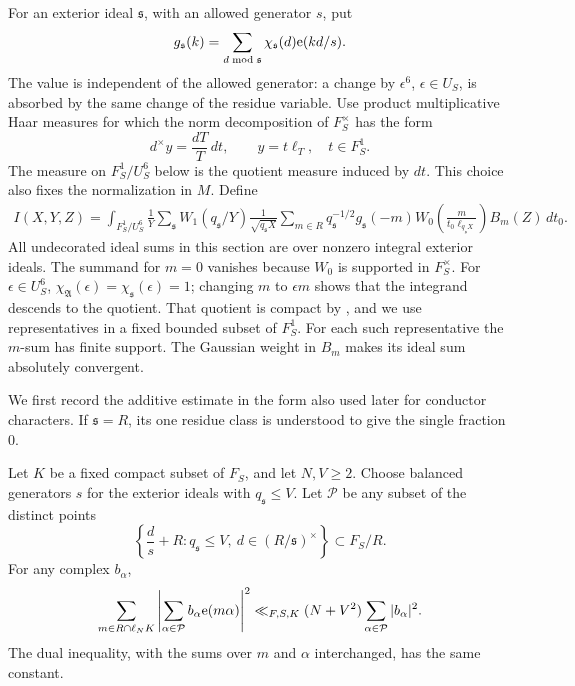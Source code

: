 For an exterior ideal \(\mathfrak s\), with an allowed generator \(s\), put
\[
 g_{\mathfrak s}(k)
   =\sum_{d\bmod\mathfrak s}\chi_{\mathfrak s}(d)\mathrm{e}(kd/s).
\]
The value is independent of the allowed generator: a change by
\(\epsilon^6\), \(\epsilon\in U_S\), is absorbed by the same change of
the residue variable.  Use product multiplicative Haar measures for which
the norm decomposition of \(F_S^\times\) has the form
\[
 d^\times y=\frac{dT}{T}\,dt,\qquad y=t\ell_T,\quad t\in F_S^1.
\]
The measure on \(F_S^1/U_S^6\) below is the quotient measure induced by
\(dt\).  This choice also fixes the normalization in \(M\).
Define
\begin{equation}
 \begin{split}
 I(X,Y,Z)=\int_{F_S^1/U_S^6}
 \frac1Y\sum_{\mathfrak s}W_1(q_{\mathfrak s}/Y)
 \frac1{\sqrt{q_{\mathfrak s}X}}\sum_{m\in R}
  q_{\mathfrak s}^{-1/2}g_{\mathfrak s}(-m)
  W_0\!\left(\frac{m}{t_0\ell_{q_{\mathfrak s}X}}\right)
  B_m(Z)\,dt_0 .
 \end{split}
\label{eq:poisson-probe}
\end{equation}
All undecorated ideal sums in this section are over nonzero integral
exterior ideals.  The summand for \(m=0\) vanishes because \(W_0\) is
supported in \(F_S^\times\).  For \(\epsilon\in U_S^6\),
\(\chi_{\mathfrak A}(\epsilon)=\chi_{\mathfrak s}(\epsilon)=1\);
changing \(m\) to \(\epsilon m\) shows that the integrand descends to the
quotient.  That quotient is compact by
, and we use representatives in a fixed
bounded subset of \(F_S^1\).  For each such representative the \(m\)-sum
has finite support.  The Gaussian weight in \(B_m\) makes its ideal sum
absolutely convergent.

We first record the additive estimate in the form also used later for
conductor characters.  If \(\mathfrak s=R\), its one residue class is
understood to give the single fraction \(0\).

\begin{lemma}\label{lem:additive-sieve}
Let \(K\) be a fixed compact subset of \(F_S\), and let \(N,V\ge2\).
Choose balanced generators \(s\) for the exterior ideals with
\(q_{\mathfrak s}\le V\).  Let \(\mathcal P\) be any subset of the distinct
points
\[
 \left\{\frac d s+R:
       q_{\mathfrak s}\le V,\ d\in(R/\mathfrak s)^\times\right\}
       \subset F_S/R.
\]
For any complex \(b_\alpha\),
\begin{equation}
 \sum_{m\in R\cap\ell_NK}
       \left|\sum_{\alpha\in\mathcal P}b_\alpha\mathrm{e}(m\alpha)\right|^2
 \ll_{F,S,K}(N+V^2)\sum_{\alpha\in\mathcal P}|b_\alpha|^2 .
\label{eq:additive-sieve}
\end{equation}
The dual inequality, with the sums over \(m\) and \(\alpha\) interchanged,
has the same constant.
\end{lemma}

